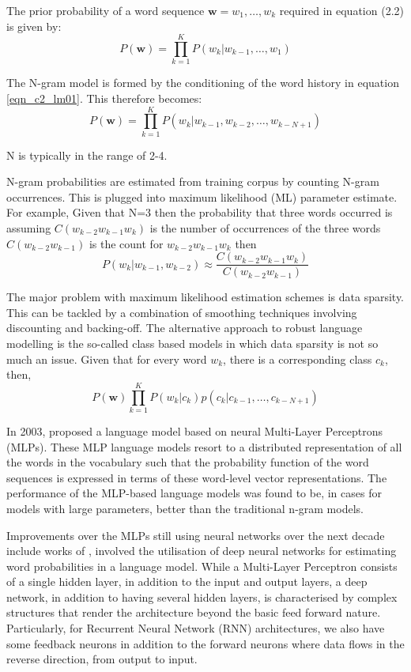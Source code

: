 The prior probability of a word sequence $\mathbf{w}=w_1,\dots,w_k$ required in equation (2.2) is given by:
\begin{equation}P(\mathbf{w})=\prod_{k=1}^KP(w_k|w_{k-1},\dots,w_1)
\label{eqn_c2_lm01}
\end{equation}

The N-gram model is formed by the conditioning of the word history in equation \ref{eqn_c2_lm01}.  This therefore becomes:
\begin{equation}P(\mathbf{w})=\prod_{k=1}^KP(w_k|w_{k-1},w_{k-2},\dots,w_{k-N+1})
\label{eqn_c2_lm02}
\end{equation}

N is typically in the range of 2-4.

N-gram probabilities are estimated from training corpus by counting N-gram occurrences.  This is plugged into maximum likelihood (ML) parameter estimate. For example, Given that N=3 then the probability that three words occurred is assuming $C(w_{k-2}w_{k-1}w_k)$ is the number of occurrences of the three words $C(w_{k-2}w_{k-1})$ is the count for $w_{k-2}w_{k-1}w_k$ then
\begin{equation}
P(w_k|w_{k-1},w_{k-2})\approx\frac{C(w_{k-2}w_{k-1}w_k)}{C(w_{k-2}w_{k-1})}
\label{eqn_c2_lm03}
\end{equation}

The major problem with maximum likelihood estimation schemes is data sparsity. This can be tackled by a combination of smoothing techniques involving discounting and backing-off.  The alternative approach to robust language modelling is the so-called class based models \citep{Brown1992class,kuhn1990cache} in which data sparsity is not so much an issue.  Given that for every word $w_k$, there is a corresponding class $c_k$, then,
\begin{equation}
P(\mathbf{w})\prod_{k=1}^KP(w_k|c_k)p(c_k|c_{k-1},\dots,c_{k-N+1})
\label{eqn_c2_lm04}
\end{equation}

In 2003,  \cite{bengio2003neural} proposed a language model based on neural Multi-Layer Perceptrons (MLPs). These MLP language models resort to a distributed representation of all the words in the vocabulary such that the probability function of the word sequences is expressed in terms of these word-level vector representations. The performance of the MLP-based language models was found to be, in cases for models with large parameters,  better than the traditional n-gram models.

Improvements over the MLPs still using neural networks over the next decade include works of \cite{mikolov2011empirical,sutskever2014sequence,luong2013better}, involved the utilisation of deep neural networks for estimating word probabilities in a language model.  While a Multi-Layer Perceptron consists of a single hidden layer, in addition to the input and output layers, a deep network, in addition to having several hidden layers, is characterised by complex structures that render the architecture beyond the basic feed forward nature. Particularly, for Recurrent Neural Network (RNN) architectures, we also have some feedback neurons in addition to the forward neurons where data flows in the reverse direction, from output to input. 

